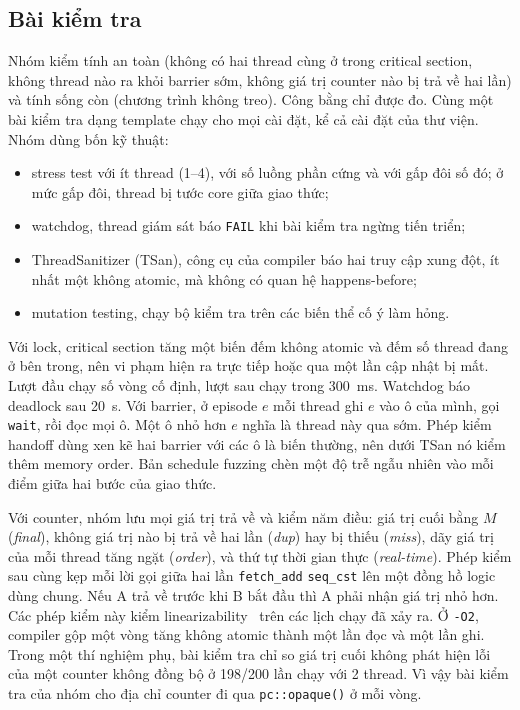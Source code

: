 \subsection{Bài kiểm tra}
Nhóm kiểm tính an toàn (không có hai thread cùng ở trong critical section, không thread nào ra khỏi
barrier sớm, không giá trị counter nào bị trả về hai lần) và tính sống còn (chương trình không treo).
Công bằng chỉ được đo. Cùng một bài kiểm tra dạng template chạy cho mọi cài đặt, kể cả cài đặt của thư
viện. Nhóm dùng bốn kỹ thuật:
\begin{itemize}[nosep]
  \item stress test với ít thread (1--4), với số luồng phần cứng và với gấp đôi số đó; ở mức gấp đôi,
    thread bị tước core giữa giao thức;
  \item watchdog, thread giám sát báo \texttt{FAIL} khi bài kiểm tra ngừng tiến triển;
  \item ThreadSanitizer (TSan), công cụ của compiler báo hai truy cập xung đột, ít nhất một không atomic,
    mà không có quan hệ happens-before;
  \item mutation testing, chạy bộ kiểm tra trên các biến thể cố ý làm hỏng.
\end{itemize}

Với lock, critical section tăng một biến đếm không atomic và đếm số thread đang ở bên trong, nên vi phạm
hiện ra trực tiếp hoặc qua một lần cập nhật bị mất. Lượt đầu chạy số vòng cố định, lượt sau chạy trong
300~ms. Watchdog báo deadlock sau 20~s. Với barrier, ở episode $e$ mỗi thread ghi $e$ vào ô của mình, gọi
\texttt{wait}, rồi đọc mọi ô. Một ô nhỏ hơn $e$ nghĩa là thread này qua sớm. Phép kiểm handoff dùng xen
kẽ hai barrier với các ô là biến thường, nên dưới TSan nó kiểm thêm memory order. Bản schedule fuzzing
chèn một độ trễ ngẫu nhiên vào mỗi điểm giữa hai bước của giao thức.

Với counter, nhóm lưu mọi giá trị trả về và kiểm năm điều: giá trị cuối bằng $M$ (\emph{final}), không
giá trị nào bị trả về hai lần (\emph{dup}) hay bị thiếu (\emph{miss}), dãy giá trị của mỗi thread tăng
ngặt (\emph{order}), và thứ tự thời gian thực (\emph{real-time}). Phép kiểm sau cùng kẹp mỗi lời gọi giữa
hai lần \texttt{fetch\_add} \texttt{seq\_cst} lên một đồng hồ logic dùng chung. Nếu A trả về trước khi B
bắt đầu thì A phải nhận giá trị nhỏ hơn. Các phép kiểm này kiểm
linearizability~\cite{herlihy1990linearizability} trên các lịch chạy đã xảy ra. Ở \texttt{-O2},
compiler gộp một vòng tăng không atomic thành một lần đọc và một lần ghi. Trong một thí nghiệm phụ, bài
kiểm tra chỉ so giá trị cuối không phát hiện lỗi của một counter không đồng bộ ở 198/200 lần chạy với 2
thread. Vì vậy bài kiểm tra của nhóm cho địa chỉ counter đi qua \texttt{pc::opaque()} ở mỗi vòng.

